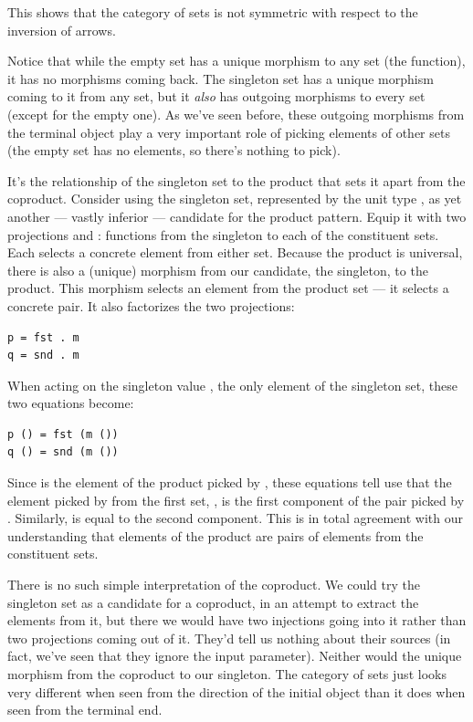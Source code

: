 This shows that the category of sets is not symmetric with respect to
the inversion of arrows.

Notice that while the empty set has a unique morphism to any set (the
 function), it has no morphisms coming back. The
singleton set has a unique morphism coming to it from any set, but it
\emph{also} has outgoing morphisms to every set (except for the empty
one). As we've seen before, these outgoing morphisms from the terminal
object play a very important role of picking elements of other sets (the
empty set has no elements, so there's nothing to pick).

It's the relationship of the singleton set to the product that sets it
apart from the coproduct. Consider using the singleton set, represented
by the unit type \code{()}, as yet another --- vastly inferior ---
candidate for the product pattern. Equip it with two projections
 and : functions from the singleton to each of the
constituent sets. Each selects a concrete element from either set.
Because the product is universal, there is also a (unique) morphism
 from our candidate, the singleton, to the product. This
morphism selects an element from the product set --- it selects a
concrete pair. It also factorizes the two projections:

\begin{Verbatim}
p = fst . m
q = snd . m
\end{Verbatim}
When acting on the singleton value \code{()}, the only element of the
singleton set, these two equations become:

\begin{Verbatim}
p () = fst (m ())
q () = snd (m ())
\end{Verbatim}
Since  is the element of the product picked by ,
these equations tell use that the element picked by  from the
first set, , is the first component of the pair picked by
. Similarly,  is equal to the second component.
This is in total agreement with our understanding that elements of the
product are pairs of elements from the constituent sets.

There is no such simple interpretation of the coproduct. We could try
the singleton set as a candidate for a coproduct, in an attempt to
extract the elements from it, but there we would have two injections
going into it rather than two projections coming out of it. They'd tell
us nothing about their sources (in fact, we've seen that they ignore the
input parameter). Neither would the unique morphism from the coproduct
to our singleton. The category of sets just looks very different when
seen from the direction of the initial object than it does when seen
from the terminal end.

